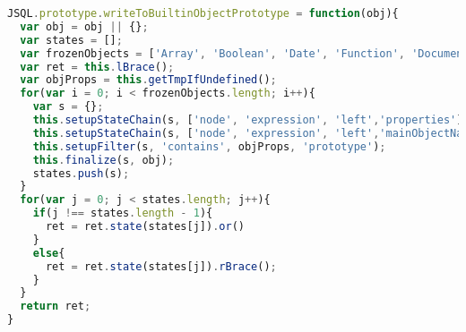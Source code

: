 \documentclass[a4paper, 12pt]{report}
\begin{document}
\begin{appendices}
\begin{lstlisting}[label={lst:WriteToBuiltinObjectPrototype},language=JavaScript,caption=The \texttt{writeToBuiltinObjectPrototype} policy,mathescape=true]
JSQL.prototype.writeToBuiltinObjectPrototype = function(obj){
  var obj = obj || {};
  var states = [];
  var frozenObjects = ['Array', 'Boolean', 'Date', 'Function', 'Document', 'Math', 'Window','String'];
  var ret = this.lBrace();
  var objProps = this.getTmpIfUndefined();
  for(var i = 0; i < frozenObjects.length; i++){
    var s = {};
    this.setupStateChain(s, ['node', 'expression', 'left','properties'], objProps);
    this.setupStateChain(s, ['node', 'expression', 'left','mainObjectName'], frozenObjects[i]);
    this.setupFilter(s, 'contains', objProps, 'prototype');
    this.finalize(s, obj);
    states.push(s);
  }
  for(var j = 0; j < states.length; j++){
    if(j !== states.length - 1){
      ret = ret.state(states[j]).or()
    }
    else{
      ret = ret.state(states[j]).rBrace();
    }
  }
  return ret;
}
\end{lstlisting}



\end{appendices}

\printbibliography
\end{document}
